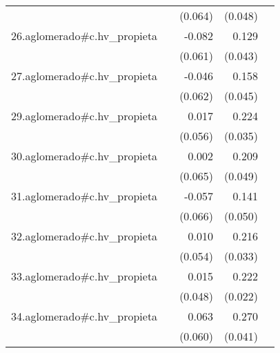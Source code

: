 {\begin{longtable}{l*{4}{D{.}{.}{-1}}}
            &                     &     (0.064)         &     (0.048)         &                     \\
\addlinespace
26.aglomerado#c.hv\_propieta&                     &      -0.082         &       0.129\sym{**} &                     \\
            &                     &     (0.061)         &     (0.043)         &                     \\
\addlinespace
27.aglomerado#c.hv\_propieta&                     &      -0.046         &       0.158\sym{***}&                     \\
            &                     &     (0.062)         &     (0.045)         &                     \\
\addlinespace
29.aglomerado#c.hv\_propieta&                     &       0.017         &       0.224\sym{***}&                     \\
            &                     &     (0.056)         &     (0.035)         &                     \\
\addlinespace
30.aglomerado#c.hv\_propieta&                     &       0.002         &       0.209\sym{***}&                     \\
            &                     &     (0.065)         &     (0.049)         &                     \\
\addlinespace
31.aglomerado#c.hv\_propieta&                     &      -0.057         &       0.141\sym{**} &                     \\
            &                     &     (0.066)         &     (0.050)         &                     \\
\addlinespace
32.aglomerado#c.hv\_propieta&                     &       0.010         &       0.216\sym{***}&                     \\
            &                     &     (0.054)         &     (0.033)         &                     \\
\addlinespace
33.aglomerado#c.hv\_propieta&                     &       0.015         &       0.222\sym{***}&                     \\
            &                     &     (0.048)         &     (0.022)         &                     \\
\addlinespace
34.aglomerado#c.hv\_propieta&                     &       0.063         &       0.270\sym{***}&                     \\
            &                     &     (0.060)         &     (0.041)         &                     \\

\end{longtable}}
